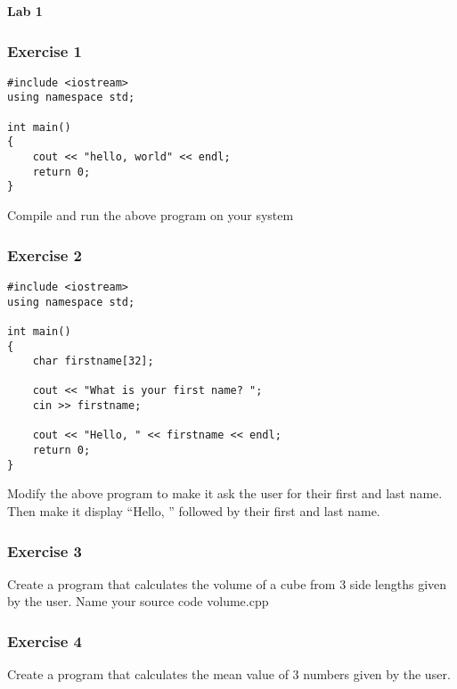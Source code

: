 \documentclass[a4paper,12pt]{article}
\begin{document}
\lstset{frame=single,basicstyle=\ttfamily,tabsize=4}

{\centering
\large \bf
Lab 1
}

\subsubsection*{Exercise 1}
\begin{lstlisting}[caption=hello.cpp]
#include <iostream>
using namespace std;

int main()
{
	cout << "hello, world" << endl;
	return 0;
}
\end{lstlisting}
Compile and run the above program on your system

\subsubsection*{Exercise 2}
\begin{lstlisting}[caption=name.cpp]
#include <iostream>
using namespace std;

int main()
{
	char firstname[32];

	cout << "What is your first name? ";
	cin >> firstname;
	
	cout << "Hello, " << firstname << endl;
	return 0;
}
\end{lstlisting}
Modify the above program to make it ask the user for their first and last name. Then make it display ``Hello, '' followed by their first and last name.

\subsubsection*{Exercise 3}
Create a program that calculates the volume of a cube from 3 side lengths given by the user. Name your source code volume.cpp

\subsubsection*{Exercise 4}
Create a program that calculates the mean value of 3 numbers given by the user.
\end{document}
